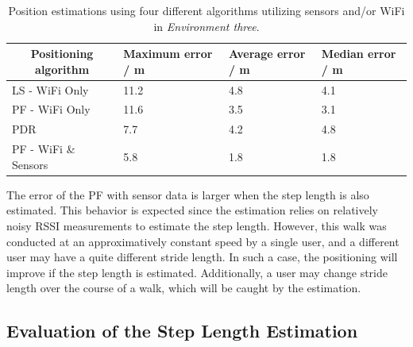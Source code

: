 \documentclass{LTHthesis}
\begin{document}
\begin{table}[!hbt]
\begin{center}
\begin{tabular}{|l|l|l|l|}
\hline
\multicolumn{1}{|c|}{Positioning algorithm} & Maximum error / m & Average error / m  & Median error / m \\
\hline
\hline
LS - WiFi Only & 11.2 & 4.8 & 4.1 \\
\hline
PF - WiFi Only & 11.6 & 3.5 & 3.1  \\
\hline
PDR & 7.7 & 4.2 & 4.8  \\
\hline
PF - WiFi \& Sensors & 5.8 & 1.8 & 1.8 \\
\hline
\end{tabular}
\end{center}
\caption{Position estimations using four different algorithms utilizing sensors and/or \newline WiFi in \emph{Environment three}.}\label{table:error_different_algorithms}
\end{table}

The error of the PF with sensor data is larger when the step length is also estimated. This behavior is expected since the estimation relies on relatively noisy RSSI measurements to estimate the step length. However, this walk was conducted at an approximatively constant speed by a single user, and a different user may have a quite different stride length. In such a case, the positioning will improve if the  step length is estimated. Additionally, a user may change stride length over the course of a walk, which will be caught by the estimation.  
%

\subsection{Evaluation of the Step Length Estimation}
\end{document}
